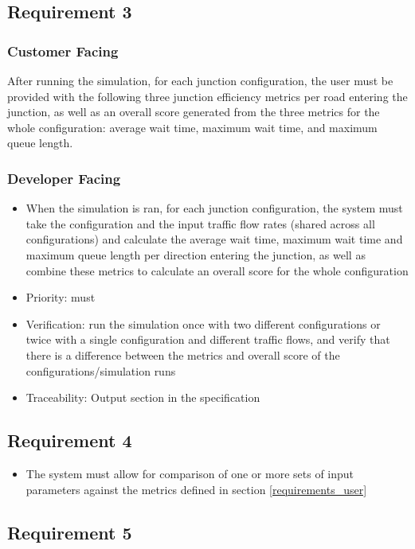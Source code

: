 \documentclass{article}
\begin{document}
\subsection{Requirement 3}
\subsubsection{Customer Facing}
After running the simulation, for each junction configuration, 
the user must be provided with the following three junction efficiency metrics 
per road entering the junction, as well as an overall score generated from the 
three metrics for the whole configuration: average wait time, maximum wait time, 
and maximum queue length.
\subsubsection{Developer Facing}
\begin{itemize}
  \item When the simulation is ran, for each junction configuration, the system 
  must take the configuration and the input traffic flow rates (shared across all 
  configurations) and calculate the average wait time, maximum wait time and 
  maximum queue length per direction entering the junction, as well as combine 
  these metrics to calculate an overall score for the whole configuration
  \item Priority: must
  \item Verification: run the simulation once with two different configurations 
  or twice with a single configuration and different traffic flows, and verify 
  that there is a difference between the metrics and overall score of the 
  configurations/simulation runs
  \item Traceability: Output section in the specification
\end{itemize}

\subsection{Requirement 4}
\begin{itemize}
  \item The system must allow for comparison of one or more sets of input parameters against the metrics defined in section \ref{requirements_user}
\end{itemize}

\subsection{Requirement 5}
\end{document}
